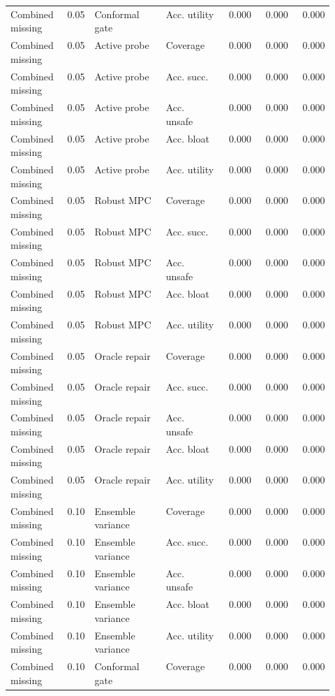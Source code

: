 \documentclass{article}
\begin{document}
\begin{center}
\begin{longtable}{p{0.14\linewidth}rp{0.22\linewidth}p{0.18\linewidth}rrr}
Combined missing & 0.05 & Conformal gate & Acc. utility & 0.000 & 0.000 & 0.000\\
Combined missing & 0.05 & Active probe & Coverage & 0.000 & 0.000 & 0.000\\
Combined missing & 0.05 & Active probe & Acc. succ. & 0.000 & 0.000 & 0.000\\
Combined missing & 0.05 & Active probe & Acc. unsafe & 0.000 & 0.000 & 0.000\\
Combined missing & 0.05 & Active probe & Acc. bloat & 0.000 & 0.000 & 0.000\\
Combined missing & 0.05 & Active probe & Acc. utility & 0.000 & 0.000 & 0.000\\
Combined missing & 0.05 & Robust MPC & Coverage & 0.000 & 0.000 & 0.000\\
Combined missing & 0.05 & Robust MPC & Acc. succ. & 0.000 & 0.000 & 0.000\\
Combined missing & 0.05 & Robust MPC & Acc. unsafe & 0.000 & 0.000 & 0.000\\
Combined missing & 0.05 & Robust MPC & Acc. bloat & 0.000 & 0.000 & 0.000\\
Combined missing & 0.05 & Robust MPC & Acc. utility & 0.000 & 0.000 & 0.000\\
Combined missing & 0.05 & Oracle repair & Coverage & 0.000 & 0.000 & 0.000\\
Combined missing & 0.05 & Oracle repair & Acc. succ. & 0.000 & 0.000 & 0.000\\
Combined missing & 0.05 & Oracle repair & Acc. unsafe & 0.000 & 0.000 & 0.000\\
Combined missing & 0.05 & Oracle repair & Acc. bloat & 0.000 & 0.000 & 0.000\\
Combined missing & 0.05 & Oracle repair & Acc. utility & 0.000 & 0.000 & 0.000\\
Combined missing & 0.10 & Ensemble variance & Coverage & 0.000 & 0.000 & 0.000\\
Combined missing & 0.10 & Ensemble variance & Acc. succ. & 0.000 & 0.000 & 0.000\\
Combined missing & 0.10 & Ensemble variance & Acc. unsafe & 0.000 & 0.000 & 0.000\\
Combined missing & 0.10 & Ensemble variance & Acc. bloat & 0.000 & 0.000 & 0.000\\
Combined missing & 0.10 & Ensemble variance & Acc. utility & 0.000 & 0.000 & 0.000\\
Combined missing & 0.10 & Conformal gate & Coverage & 0.000 & 0.000 & 0.000\\

\end{longtable}
\end{center}
\end{document}
